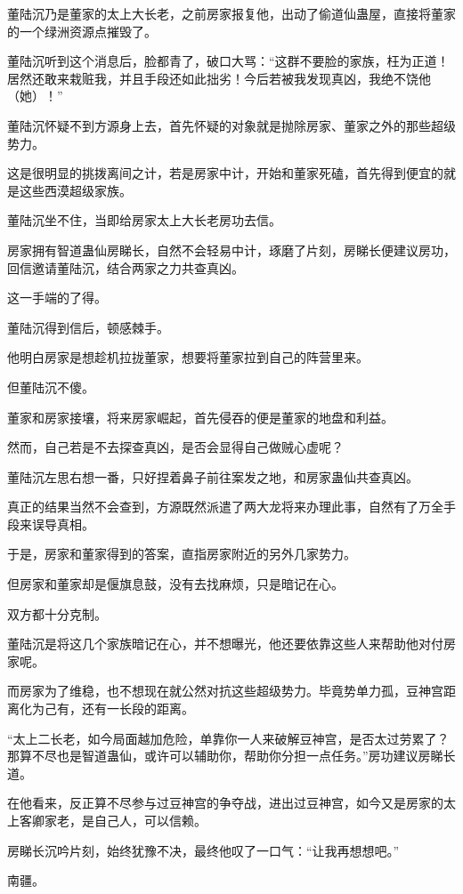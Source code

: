 \begin{this_body}
董陆沉乃是董家的太上大长老，之前房家报复他，出动了偷道仙蛊屋，直接将董家的一个绿洲资源点摧毁了。

董陆沉听到这个消息后，脸都青了，破口大骂：“这群不要脸的家族，枉为正道！居然还敢来栽赃我，并且手段还如此拙劣！今后若被我发现真凶，我绝不饶他（她）！”

董陆沉怀疑不到方源身上去，首先怀疑的对象就是抛除房家、董家之外的那些超级势力。

这是很明显的挑拨离间之计，若是房家中计，开始和董家死磕，首先得到便宜的就是这些西漠超级家族。

董陆沉坐不住，当即给房家太上大长老房功去信。

房家拥有智道蛊仙房睇长，自然不会轻易中计，琢磨了片刻，房睇长便建议房功，回信邀请董陆沉，结合两家之力共查真凶。

这一手端的了得。

董陆沉得到信后，顿感棘手。

他明白房家是想趁机拉拢董家，想要将董家拉到自己的阵营里来。

但董陆沉不傻。

董家和房家接壤，将来房家崛起，首先侵吞的便是董家的地盘和利益。

然而，自己若是不去探查真凶，是否会显得自己做贼心虚呢？

董陆沉左思右想一番，只好捏着鼻子前往案发之地，和房家蛊仙共查真凶。

真正的结果当然不会查到，方源既然派遣了两大龙将来办理此事，自然有了万全手段来误导真相。

于是，房家和董家得到的答案，直指房家附近的另外几家势力。

但房家和董家却是偃旗息鼓，没有去找麻烦，只是暗记在心。

双方都十分克制。

董陆沉是将这几个家族暗记在心，并不想曝光，他还要依靠这些人来帮助他对付房家呢。

而房家为了维稳，也不想现在就公然对抗这些超级势力。毕竟势单力孤，豆神宫距离化为己有，还有一长段的距离。

“太上二长老，如今局面越加危险，单靠你一人来破解豆神宫，是否太过劳累了？那算不尽也是智道蛊仙，或许可以辅助你，帮助你分担一点任务。”房功建议房睇长道。

在他看来，反正算不尽参与过豆神宫的争夺战，进出过豆神宫，如今又是房家的太上客卿家老，是自己人，可以信赖。

房睇长沉吟片刻，始终犹豫不决，最终他叹了一口气：“让我再想想吧。”

南疆。


\end{this_body}
